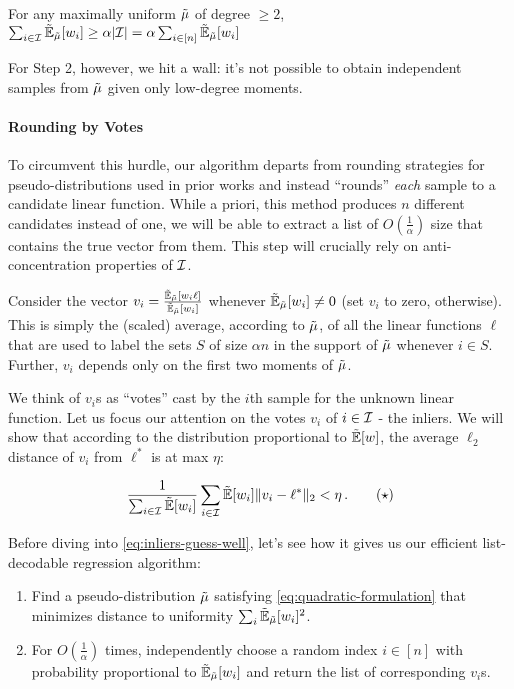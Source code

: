 \begin{proposition}
For any maximally uniform $\tilde{\mu}$ of degree $\geq 2$,  $\sum_{i \in \mathcal I} \operatorname{\tilde{\mathbb{E}}}_{\tilde{\mu}}[w_i]  \geq \alpha |\mathcal I| = \alpha \sum_{i\in [n]} \operatorname{\tilde{\mathbb{E}}}_{\tilde{\mu}}[w_i]$\mper\label{prop:good-weight-on-inliers}
\end{proposition} 

For Step 2, however, we hit a wall: it's not possible to obtain independent samples from $\tilde{\mu}$ given only low-degree moments. 

\paragraph{Rounding by Votes} To circumvent this hurdle, our algorithm departs from rounding strategies for pseudo-distributions used in prior works and instead ``rounds'' \emph{each} sample to a candidate linear function. While a priori, this method produces $n$ different candidates instead of one, we will be able to extract a list of $O(\frac{1}{\alpha})$ size that contains the true vector from them. This step will crucially rely on anti-concentration properties of $\mathcal I$. 

Consider the vector $v_i = \frac{\operatorname{\tilde{\mathbb{E}}}_{\tilde{\mu}}[w_i \ell]}{\operatorname{\tilde{\mathbb{E}}}_{\tilde{\mu}}[w_i]}$ whenever $\operatorname{\tilde{\mathbb{E}}}_{\tilde{\mu}}[w_i] \neq 0$ (set $v_i$ to zero, otherwise).  This is simply the (scaled) average, according to $\tilde{\mu}$, of all the linear functions $\ell$ that are used to label the sets $S$ of size $\alpha n$ in the support of $\tilde{\mu}$ whenever $i \in S$. Further, $v_i$ depends only on the first two moments of $\tilde{\mu}$.

We think of $v_i$s as ``votes''%
cast by the $i$th sample for the unknown linear function. 
Let us focus our attention on the votes $v_i$ of $i \in \mathcal I$ - the inliers. We will show that according to the distribution proportional to $\operatorname{\tilde{\mathbb{E}}}[w]$, the average $\ell_2$ distance of $v_i$ from $\ell^*$ is at max $\eta$:

\begin{equation}
\frac{1}{\sum_{i \in \cI} \pE[w_i]} \sum_{i \in \cI} \pE[w_i] \| v_i - \ell^*\|_2  < \eta \mper \label{eq:inliers-guess-well}\tag{$\star$}
\end{equation}

Before diving into \eqref{eq:inliers-guess-well}, let's see how it gives us our efficient list-decodable regression algorithm:

\begin{enumerate}
	\item Find a pseudo-distribution $\tilde{\mu}$ satisfying \eqref{eq:quadratic-formulation} that minimizes distance to uniformity $\sum_i \operatorname{\tilde{\mathbb{E}}}_{\tilde{\mu}}[w_i]^2$.
	\item For $O(\frac{1}{\alpha})$ times, independently choose a random index $i \in [n]$ with probability proportional to $\operatorname{\tilde{\mathbb{E}}}_{\tilde{\mu}}[w_i]$ and return the list of corresponding $v_i$s. 
\end{enumerate} 


